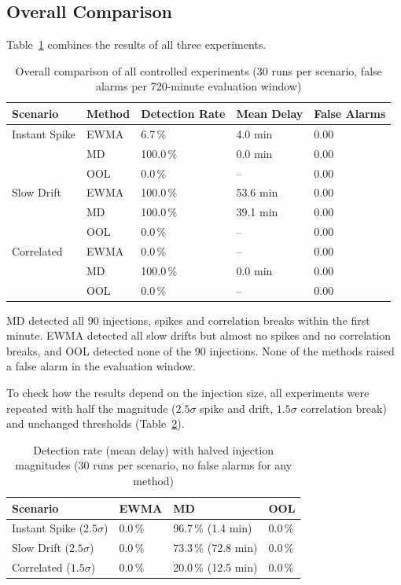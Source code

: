 \subsection{Overall Comparison}
Table~\ref{tab:overall_results} combines the results of all three experiments.

\begin{table}[H]
\centering
\begin{tabularx}{\textwidth}{p{3.2cm}p{1.6cm}XXX}
\toprule
\textbf{Scenario} & \textbf{Method} & \textbf{Detection Rate} & \textbf{Mean Delay} & \textbf{False Alarms} \\
\midrule
Instant Spike & EWMA & 6.7\,\%   & 4.0 min  & 0.00 \\
              & MD   & 100.0\,\% & 0.0 min  & 0.00 \\
              & OOL  & 0.0\,\%   & --       & 0.00 \\
\midrule
Slow Drift    & EWMA & 100.0\,\% & 53.6 min & 0.00 \\
              & MD   & 100.0\,\% & 39.1 min & 0.00 \\
              & OOL  & 0.0\,\%   & --       & 0.00 \\
\midrule
Correlated    & EWMA & 0.0\,\%   & --       & 0.00 \\
              & MD   & 100.0\,\% & 0.0 min  & 0.00 \\
              & OOL  & 0.0\,\%   & --       & 0.00 \\
\bottomrule
\end{tabularx}
\caption{Overall comparison of all controlled experiments (30 runs per scenario, false alarms per 720-minute evaluation window)}
\label{tab:overall_results}
\end{table}

MD detected all 90 injections, spikes and correlation breaks within the first minute. EWMA detected all slow drifts but almost no spikes and no correlation breaks, and OOL detected none of the 90 injections. None of the methods raised a false alarm in the evaluation window.

To check how the results depend on the injection size, all experiments were repeated with half the magnitude ($2.5\sigma$ spike and drift, $1.5\sigma$ correlation break) and unchanged thresholds (Table~\ref{tab:magnitude_results}).

\begin{table}[H]
\centering
\begin{tabularx}{\textwidth}{p{3.8cm}XXX}
\toprule
\textbf{Scenario} & \textbf{EWMA} & \textbf{MD} & \textbf{OOL} \\
\midrule
Instant Spike ($2.5\sigma$) & 0.0\,\% & 96.7\,\% (1.4 min)  & 0.0\,\% \\
Slow Drift ($2.5\sigma$)    & 0.0\,\% & 73.3\,\% (72.8 min) & 0.0\,\% \\
Correlated ($1.5\sigma$)    & 0.0\,\% & 20.0\,\% (12.5 min) & 0.0\,\% \\
\bottomrule
\end{tabularx}
\caption{Detection rate (mean delay) with halved injection magnitudes (30 runs per scenario, no false alarms for any method)}
\label{tab:magnitude_results}
\end{table}

